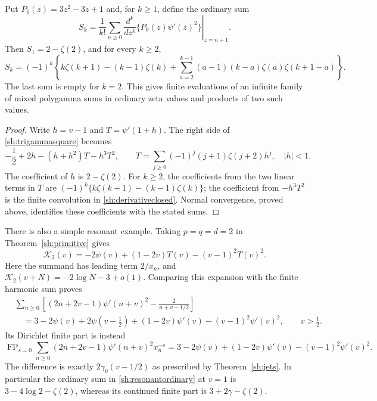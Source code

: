 \begin{corollary}\label{sh:allderivatives}
Put $P_0(z)=3z^2-3z+1$ and, for $k\ge1$, define the ordinary sum
\[
 S_k=\frac1{k!}\sum_{n\ge0}
     \left.\frac{d^k}{dz^k}\{P_0(z)\psi'(z)^2\}
                                  \right|_{z=n+1}.
\]
Then $S_1=2-\zeta(2)$, and for every $k\ge2$,
\begin{equation}\label{sh:derivativeclosed}
 \boxed{S_k=(-1)^k\left\{
      k\zeta(k+1)-(k-1)\zeta(k)
      +\sum_{a=2}^{k-1}(a-1)(k-a)
                     \zeta(a)\zeta(k+1-a)\right\}.}
\end{equation}
The last sum is empty for $k=2$.  This gives finite evaluations of
an infinite family of mixed polygamma sums in ordinary zeta values
and products of two such values.
\end{corollary}

\begin{proof}
Write $h=v-1$ and $T=\psi'(1+h)$.  The right side of
\eqref{sh:trigammasquare} becomes
\[
 -\frac12+2h-(h+h^2)T-h^3T^2,
 \qquad
 T=\sum_{j\ge0}(-1)^j(j+1)\zeta(j+2)h^j,
 \quad |h|<1.
\]
The coefficient of $h$ is $2-\zeta(2)$.  For $k\ge2$, the
coefficients from the two linear terms in $T$ are
$(-1)^k\{k\zeta(k+1)-(k-1)\zeta(k)\}$; the coefficient
from $-h^3T^2$ is the finite convolution in
\eqref{sh:derivativeclosed}.  Normal convergence, proved above,
identifies these coefficients with the stated sums.
\end{proof}

There is also a simple resonant example.  Taking $p=q=d=2$ in
Theorem~\ref{sh:primitive} gives
\[
 \mathcal K_2(v)=-2\psi(v)+(1-2v)T(v)-(v-1)^2T(v)^2.
\]
Here the summand has leading term $2/x_n$, and
$\mathcal K_2(v+N)=-2\log N-3+o(1)$.  Comparing this expansion
with the finite harmonic sum proves
\begin{equation}\label{sh:resonantordinary}
 \boxed{\begin{aligned}
 &\sum_{n\ge0}\left[
     (2n+2v-1)\psi'(n+v)^2-\frac2{n+v-1/2}\right]\\
 &\quad=3-2\psi(v)+2\psi(v-\tfrac12)
                 +(1-2v)\psi'(v)-(v-1)^2\psi'(v)^2,
 \qquad v>\tfrac12.
 \end{aligned}}
\end{equation}
Its Dirichlet finite part is instead
\begin{equation}\label{sh:resonantFP}
 \operatorname{FP}_{s=0}
   \sum_{n\ge0}(2n+2v-1)\psi'(n+v)^2x_n^{-s}
 =3-2\psi(v)+(1-2v)\psi'(v)-(v-1)^2\psi'(v)^2.
\end{equation}
The difference is exactly $2\gamma_0(v-1/2)$ as prescribed by
Theorem~\ref{sh:jets}.  In particular the ordinary sum in
\eqref{sh:resonantordinary} at $v=1$ is
$3-4\log2-\zeta(2)$, whereas its continued finite part is
$3+2\gamma-\zeta(2)$.

